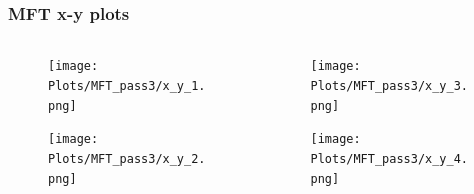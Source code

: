 \documentclass[11pt]{beamer}
\begin{document}
\begin{frame}
    \frametitle{MFT x-y plots}

    \begin{columns}[c]
        \begin{column}{0.5\textwidth}
            \begin{figure}
                \begin{center}
                    \texttt{[image: Plots/MFT\_pass3/x\_y\_1.png]}
                \end{center}
            \end{figure}
            \begin{figure}
                \begin{center}
                    \texttt{[image: Plots/MFT\_pass3/x\_y\_2.png]}
                \end{center}
            \end{figure}
        \end{column}
        \begin{column}{0.5\textwidth}
            \begin{figure}
                \begin{center}
                    \texttt{[image: Plots/MFT\_pass3/x\_y\_3.png]}
                \end{center}
            \end{figure}
            \begin{figure}
                \begin{center}
                    \texttt{[image: Plots/MFT\_pass3/x\_y\_4.png]}
                \end{center}
            \end{figure}
        \end{column}
    \end{columns}

\end{frame}
\end{document}

